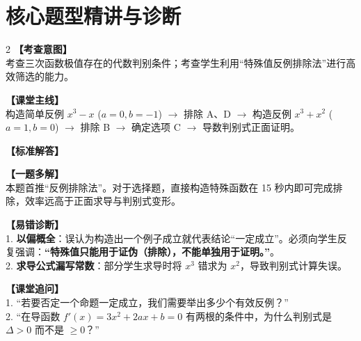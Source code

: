 \documentclass[12pt,a4paper]{ctexart}
\begin{document}
\newpage

\section{核心题型精讲与诊断}

\qOneStem
\qOneOptions

\begin{paracol}{2}
  \textbf{【考查意图】}\\
  考查三次函数极值存在的代数判别条件；考查学生利用“特殊值反例排除法”进行高效筛选的能力。
  
  \textbf{【课堂主线】}\\
  构造简单反例 \(x^3-x\) (\(a=0,b=-1\)) \(\to\) 排除 A、D \(\to\) 构造反例 \(x^3+x^2\) (\(a=1,b=0\)) \(\to\) 排除 B \(\to\) 确定选项 C \(\to\) 导数判别式正面证明。
  
  \textbf{【标准解答】}\\
  \qOneSolution
  
  \textbf{【一题多解】}\\
  本题首推“反例排除法”。对于选择题，直接构造特殊函数在 15 秒内即可完成排除，效率远高于正面求导与判别式变形。

  \switchcolumn
  \textbf{【易错诊断】}\\
  1. \textbf{以偏概全}：误认为构造出一个例子成立就代表结论“一定成立”。必须向学生反复强调：\textbf{“特殊值只能用于证伪（排除），不能单独用于证明。”}。\\
  2. \textbf{求导公式漏写常数}：部分学生求导时将 \(x^3\) 错求为 \(x^2\)，导致判别式计算失误。
  
  \textbf{【课堂追问】}\\
  1. “若要否定一个命题一定成立，我们需要举出多少个有效反例？”\\
  2. “在导函数 \(f'(x)=3x^2+2ax+b=0\) 有两根的条件中，为什么判别式是 \(\Delta > 0\) 而不是 \(\geqslant 0\)？”
\end{paracol}

\vspace{0.8em}
\par{}
\vspace{0.8em}

\qTwoStem
\qTwoOptions
\end{document}
